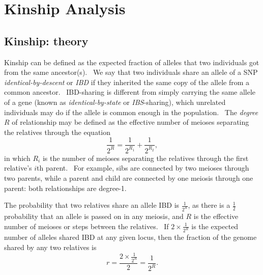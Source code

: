 \documentclass[
]{book}
\begin{document}
\hypertarget{kinship-analysis}{%
\chapter{Kinship Analysis}\label{kinship-analysis}}

\hypertarget{kinship-theory}{%
\section{Kinship: theory}\label{kinship-theory}}

Kinship can be defined as the expected fraction of alleles that two individuals got from the same ancestor(s).~ We say that two individuals share an allele of a SNP \emph{identical-by-descent} or \emph{IBD} if they inherited the same copy of the allele from a common ancestor.~ IBD-sharing is different from simply carrying the same allele of a gene (known as \emph{identical-by-state} or \emph{IBS}-sharing), which unrelated individuals may do if the allele is common enough in the population.~ The \emph{degree} \(R\) of relationship may be defined as the effective number of meioses separating the relatives through the equation
\begin{equation}
\frac{1}{2^R}=\frac{1}{2^{R_1}}+\frac{1}{2^{R_2}},
\label{eq:eqn}
\end{equation}
in which \(R_i\) is the number of meioses separating the relatives through the first relative's \(i\)th parent.~ For example, sibs are connected by two meioses through two parents, while a parent and child are connected by one meiosis through one parent: both relationships are degree-1.

The probability that two relatives share an allele IBD is \(\frac{1}{2^R}\), as there is a \(\frac{1}{2}\) probability that an allele is passed on in any meiosis, and \(R\) is the effective number of meioses or steps between the relatives.~ If \(2\times\frac{1}{2^R}\) is the expected number of alleles shared IBD at any given locus, then the fraction of the genome shared by any two relatives is
\begin{equation}
r=\frac{2\times\frac{1}{2^R}}{2}=\frac{1}{2^R}.
\label{eq:2}
\end{equation}
\end{document}
